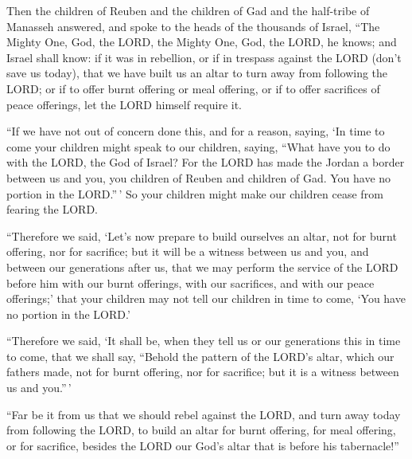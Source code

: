  Then the children of Reuben and the children of Gad and
the half-tribe of Manasseh answered, and spoke to the heads of the
thousands of Israel,  ``The Mighty One, God, the LORD, the
Mighty One, God, the LORD, he knows; and Israel shall know: if it was in
rebellion, or if in trespass against the LORD (don't save us today),
 that we have built us an altar to turn away from following
the LORD; or if to offer burnt offering or meal offering, or if to offer
sacrifices of peace offerings, let the LORD himself require it.

 ``If we have not out of concern done this, and for a
reason, saying, `In time to come your children might speak to our
children, saying, ``What have you to do with the LORD, the God of
Israel?  For the LORD has made the Jordan a border between
us and you, you children of Reuben and children of Gad. You have no
portion in the LORD.''\,' So your children might make our children cease
from fearing the LORD.

 ``Therefore we said, `Let's now prepare to build ourselves
an altar, not for burnt offering, nor for sacrifice;  but
it will be a witness between us and you, and between our generations
after us, that we may perform the service of the LORD before him with
our burnt offerings, with our sacrifices, and with our peace offerings;'
that your children may not tell our children in time to come, `You have
no portion in the LORD.'

 ``Therefore we said, `It shall be, when they tell us or
our generations this in time to come, that we shall say, ``Behold the
pattern of the LORD's altar, which our fathers made, not for burnt
offering, nor for sacrifice; but it is a witness between us and
you.''\,'

 ``Far be it from us that we should rebel against the LORD,
and turn away today from following the LORD, to build an altar for burnt
offering, for meal offering, or for sacrifice, besides the LORD our
God's altar that is before his tabernacle!''

